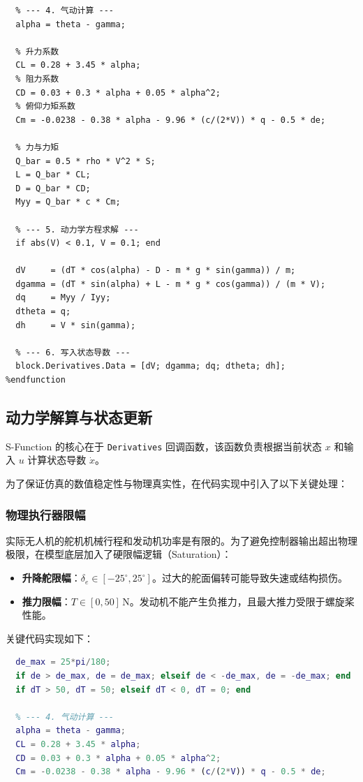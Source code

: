 \documentclass[UTF8, a4paper, 12pt]{ctexart}
\begin{document}
\begin{lstlisting}
  % --- 4. 气动计算 ---
  alpha = theta - gamma;
  
  % 升力系数
  CL = 0.28 + 3.45 * alpha;
  % 阻力系数
  CD = 0.03 + 0.3 * alpha + 0.05 * alpha^2; 
  % 俯仰力矩系数
  Cm = -0.0238 - 0.38 * alpha - 9.96 * (c/(2*V)) * q - 0.5 * de;

  % 力与力矩
  Q_bar = 0.5 * rho * V^2 * S;
  L = Q_bar * CL;
  D = Q_bar * CD;
  Myy = Q_bar * c * Cm;

  % --- 5. 动力学方程求解 ---
  if abs(V) < 0.1, V = 0.1; end 

  dV     = (dT * cos(alpha) - D - m * g * sin(gamma)) / m;
  dgamma = (dT * sin(alpha) + L - m * g * cos(gamma)) / (m * V);
  dq     = Myy / Iyy;
  dtheta = q;
  dh     = V * sin(gamma);

  % --- 6. 写入状态导数 ---
  block.Derivatives.Data = [dV; dgamma; dq; dtheta; dh];
%endfunction
\end{lstlisting}


\subsection{动力学解算与状态更新}
S-Function 的核心在于 \texttt{Derivatives} 回调函数，该函数负责根据当前状态 $x$ 和输入 $u$ 计算状态导数 $\dot{x}$。

为了保证仿真的数值稳定性与物理真实性，在代码实现中引入了以下关键处理：

\subsubsection{物理执行器限幅}
实际无人机的舵机机械行程和发动机功率是有限的。为了避免控制器输出超出物理极限，在模型底层加入了硬限幅逻辑（Saturation）：
\begin{itemize}
    \item \textbf{升降舵限幅}：$\delta_e \in [-25^\circ, 25^\circ]$。过大的舵面偏转可能导致失速或结构损伤。
    \item \textbf{推力限幅}：$T \in [0, 50]\,\text{N}$。发动机不能产生负推力，且最大推力受限于螺旋桨性能。
\end{itemize}

关键代码实现如下：
\begin{lstlisting}[language=Matlab, caption={物理限幅与气动计算代码片段}]
  % --- 3. 物理限幅 (模拟执行器限制) ---
  de_max = 25*pi/180;
  if de > de_max, de = de_max; elseif de < -de_max, de = -de_max; end
  if dT > 50, dT = 50; elseif dT < 0, dT = 0; end

  % --- 4. 气动计算 ---
  alpha = theta - gamma;
  CL = 0.28 + 3.45 * alpha;
  CD = 0.03 + 0.3 * alpha + 0.05 * alpha^2; 
  Cm = -0.0238 - 0.38 * alpha - 9.96 * (c/(2*V)) * q - 0.5 * de;
\end{lstlisting}
\end{document}
